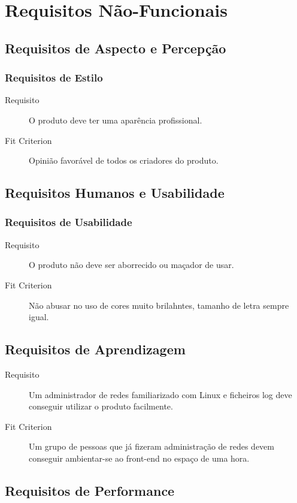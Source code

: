 \chapter{Requisitos Não-Funcionais}
\minitoc
\section{Requisitos de Aspecto e Percepção}
\subsection{Requisitos de Estilo}
\begin{description}
\item[Requisito] O produto deve ter uma aparência profissional.
\item[Fit Criterion] Opinião favorável de todos os criadores do produto.
\end{description}

\section{Requisitos Humanos e Usabilidade}
\subsection{Requisitos de Usabilidade}
\begin{description}
\item[Requisito] O produto não deve ser aborrecido ou maçador de usar.
\item[Fit Criterion] Não abusar no uso de cores muito brilahntes, tamanho de letra sempre igual.
\end{description}

\section{Requisitos de Aprendizagem}
\begin{description}
\item[Requisito] Um administrador de redes familiarizado com Linux e ficheiros log deve conseguir utilizar o produto facilmente.
\item[Fit Criterion] Um grupo de pessoas que já fizeram administração de redes devem conseguir ambientar-se ao front-end no espaço de uma hora.
\end{description}

\section{Requisitos de Performance}
